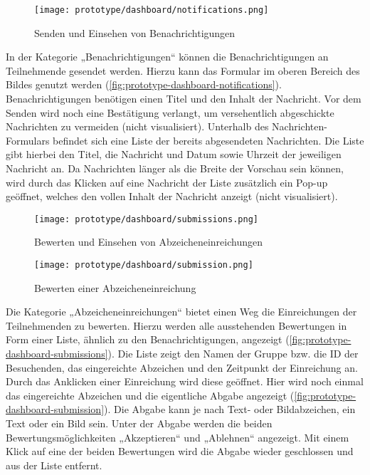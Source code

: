 \begin{figure}[htb]
    \centering
    \texttt{[image: prototype/dashboard/notifications.png]}
    \caption{Senden und Einsehen von Benachrichtigungen}
    \label{fig:prototype-dashboard-notifications}
\end{figure}

In der Kategorie „Benachrichtigungen“ können die Benachrichtigungen an
Teilnehmende gesendet werden. Hierzu kann das Formular im oberen Bereich des
Bildes genutzt werden (\autoref{fig:prototype-dashboard-notifications}).
Benachrichtigungen benötigen einen Titel und den Inhalt der Nachricht. Vor dem
Senden wird noch eine Bestätigung verlangt, um versehentlich abgeschickte
Nachrichten zu vermeiden (nicht visualisiert). Unterhalb des
Nachrichten-Formulars befindet sich eine Liste der bereits abgesendeten
Nachrichten. Die Liste gibt hierbei den Titel, die Nachricht und Datum sowie
Uhrzeit der jeweiligen Nachricht an. Da Nachrichten länger als die Breite der
Vorschau sein können, wird durch das Klicken auf eine Nachricht der Liste
zusätzlich ein Pop-up geöffnet, welches den vollen Inhalt der Nachricht anzeigt
(nicht visualisiert).

\begin{figure}[htpb]
    \centering
    \texttt{[image: prototype/dashboard/submissions.png]}
    \caption{Bewerten und Einsehen von Abzeicheneinreichungen}
    \label{fig:prototype-dashboard-submissions}
\end{figure}

\begin{figure}[htpb]
    \centering
    \texttt{[image: prototype/dashboard/submission.png]}
    \caption{Bewerten einer Abzeicheneinreichung}
    \label{fig:prototype-dashboard-submission}
\end{figure}

Die Kategorie „Abzeicheneinreichungen“ bietet einen Weg die Einreichungen der
Teilnehmenden zu bewerten. Hierzu werden alle ausstehenden Bewertungen in Form
einer Liste, ähnlich zu den Benachrichtigungen, angezeigt (\autoref{fig:prototype-dashboard-submissions}). Die Liste zeigt den Namen der
Gruppe bzw. die ID der Besuchenden, das eingereichte Abzeichen und den
Zeitpunkt der Einreichung an. Durch das Anklicken einer Einreichung wird diese
geöffnet. Hier wird noch einmal das eingereichte Abzeichen und die
eigentliche Abgabe angezeigt (\autoref{fig:prototype-dashboard-submission}).
Die Abgabe kann je nach Text- oder Bildabzeichen, ein Text oder ein Bild sein.
Unter der Abgabe werden die beiden Bewertungsmöglichkeiten „Akzeptieren“ und
„Ablehnen“ angezeigt. Mit einem Klick auf eine der beiden Bewertungen wird die
Abgabe wieder geschlossen und aus der Liste entfernt.

